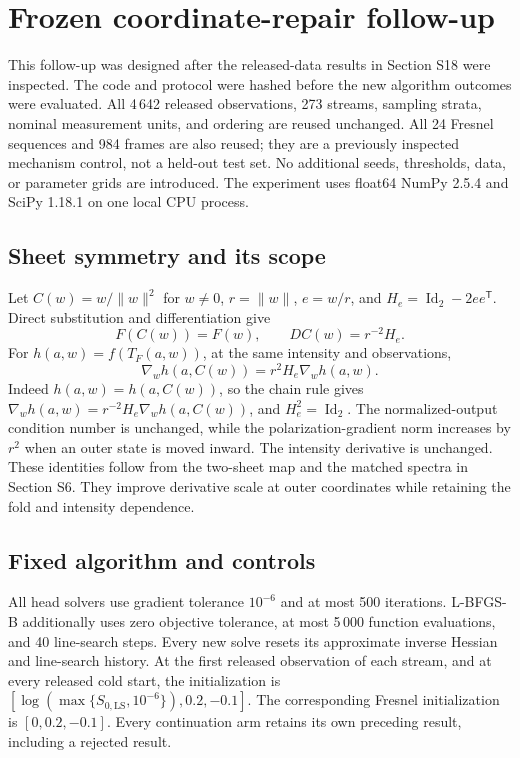 \section{Frozen coordinate-repair follow-up}
\label{sec:schartrepair}
This follow-up was designed after the released-data results in Section S18 were inspected. The code and protocol were hashed before the new algorithm outcomes were evaluated. All 4\,642 released observations, 273 streams, sampling strata, nominal measurement units, and ordering are reused unchanged. All 24 Fresnel sequences and 984 frames are also reused; they are a previously inspected mechanism control, not a held-out test set. No additional seeds, thresholds, data, or parameter grids are introduced. The experiment uses float64 NumPy 2.5.4 and SciPy 1.18.1 on one local CPU process.

\subsection{Sheet symmetry and its scope}
Let $C(w)=w/\|w\|^2$ for $w\ne0$, $r=\|w\|$, $e=w/r$, and $H_e=\operatorname{Id}_2-2ee^{\mathsf T}$. Direct substitution and differentiation give
\begin{equation}
 F(C(w))=F(w),\qquad DC(w)=r^{-2}H_e.
 \label{eq:chartidentity}
\end{equation}
For $h(a,w)=f(T_F(a,w))$, at the same intensity and observations,
\begin{equation}
 \nabla_w h(a,C(w))=r^2H_e\nabla_w h(a,w).
 \label{eq:chartgradient}
\end{equation}
Indeed $h(a,w)=h(a,C(w))$, so the chain rule gives $\nabla_w h(a,w)=r^{-2}H_e\nabla_w h(a,C(w))$, and $H_e^2=\operatorname{Id}_2$. The normalized-output condition number is unchanged, while the polarization-gradient norm increases by $r^2$ when an outer state is moved inward. The intensity derivative is unchanged. These identities follow from the two-sheet map and the matched spectra in Section S6. They improve derivative scale at outer coordinates while retaining the fold and intensity dependence.

\subsection{Fixed algorithm and controls}
All head solvers use gradient tolerance $10^{-6}$ and at most 500 iterations. L-BFGS-B additionally uses zero objective tolerance, at most 5\,000 function evaluations, and 40 line-search steps. Every new solve resets its approximate inverse Hessian and line-search history. At the first released observation of each stream, and at every released cold start, the initialization is $[\log(\max\{S_{0,\mathrm{LS}},10^{-6}\}),0.2,-0.1]$. The corresponding Fresnel initialization is $[0,0.2,-0.1]$. Every continuation arm retains its own preceding result, including a rejected result.

